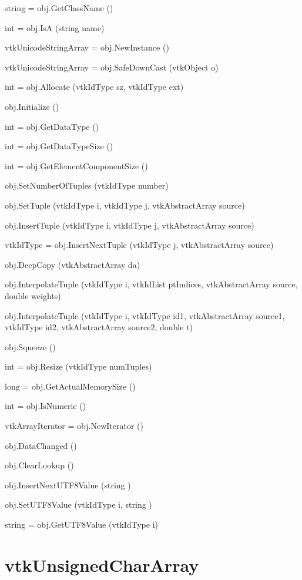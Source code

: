 \begin{DoxyItemize}
\item {\ttfamily string = obj.\-Get\-Class\-Name ()}  
\item {\ttfamily int = obj.\-Is\-A (string name)}  
\item {\ttfamily vtk\-Unicode\-String\-Array = obj.\-New\-Instance ()}  
\item {\ttfamily vtk\-Unicode\-String\-Array = obj.\-Safe\-Down\-Cast (vtk\-Object o)}  
\item {\ttfamily int = obj.\-Allocate (vtk\-Id\-Type sz, vtk\-Id\-Type ext)}  
\item {\ttfamily obj.\-Initialize ()}  
\item {\ttfamily int = obj.\-Get\-Data\-Type ()}  
\item {\ttfamily int = obj.\-Get\-Data\-Type\-Size ()}  
\item {\ttfamily int = obj.\-Get\-Element\-Component\-Size ()}  
\item {\ttfamily obj.\-Set\-Number\-Of\-Tuples (vtk\-Id\-Type number)}  
\item {\ttfamily obj.\-Set\-Tuple (vtk\-Id\-Type i, vtk\-Id\-Type j, vtk\-Abstract\-Array source)}  
\item {\ttfamily obj.\-Insert\-Tuple (vtk\-Id\-Type i, vtk\-Id\-Type j, vtk\-Abstract\-Array source)}  
\item {\ttfamily vtk\-Id\-Type = obj.\-Insert\-Next\-Tuple (vtk\-Id\-Type j, vtk\-Abstract\-Array source)}  
\item {\ttfamily obj.\-Deep\-Copy (vtk\-Abstract\-Array da)}  
\item {\ttfamily obj.\-Interpolate\-Tuple (vtk\-Id\-Type i, vtk\-Id\-List pt\-Indices, vtk\-Abstract\-Array source, double weights)}  
\item {\ttfamily obj.\-Interpolate\-Tuple (vtk\-Id\-Type i, vtk\-Id\-Type id1, vtk\-Abstract\-Array source1, vtk\-Id\-Type id2, vtk\-Abstract\-Array source2, double t)}  
\item {\ttfamily obj.\-Squeeze ()}  
\item {\ttfamily int = obj.\-Resize (vtk\-Id\-Type num\-Tuples)}  
\item {\ttfamily long = obj.\-Get\-Actual\-Memory\-Size ()}  
\item {\ttfamily int = obj.\-Is\-Numeric ()}  
\item {\ttfamily vtk\-Array\-Iterator = obj.\-New\-Iterator ()}  
\item {\ttfamily obj.\-Data\-Changed ()}  
\item {\ttfamily obj.\-Clear\-Lookup ()}  
\item {\ttfamily obj.\-Insert\-Next\-U\-T\-F8\-Value (string )}  
\item {\ttfamily obj.\-Set\-U\-T\-F8\-Value (vtk\-Id\-Type i, string )}  
\item {\ttfamily string = obj.\-Get\-U\-T\-F8\-Value (vtk\-Id\-Type i)}  
\end{DoxyItemize}\hypertarget{vtkcommon_vtkunsignedchararray}{}\section{vtk\-Unsigned\-Char\-Array}\label{vtkcommon_vtkunsignedchararray}
